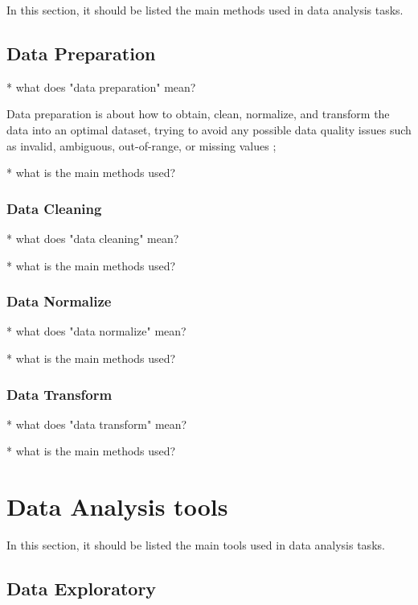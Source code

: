 \documentclass[12pt,a4paper]{amsart}
\numberwithin{equation}{section}
\theoremstyle{plain}
\theoremstyle{definition}
\begin{document}
In this section, it should be listed the main methods used in data analysis tasks.

\subsection{Data Preparation}\label{data-preparation}

* what does "data preparation" mean?

Data preparation is about how to obtain, clean, normalize, and transform the data into an optimal dataset, trying to avoid any possible data quality issues such as invalid, ambiguous, out-of-range, or missing values \cite{cuesta2016practical};

* what is the main methods used?

\subsubsection{Data Cleaning}\label{data-cleaning}

* what does "data cleaning" mean?

* what is the main methods used?

\subsubsection{Data Normalize}\label{data-normalize}

* what does "data normalize" mean?

* what is the main methods used?

\subsubsection{Data Transform}\label{data-transform}

* what does "data transform" mean?

* what is the main methods used?


\section{Data Analysis tools}\label{tools}

In this section, it should be listed the main tools used in data analysis tasks.

\subsection{Data Exploratory}\label{data-exploratory}
\end{document}

